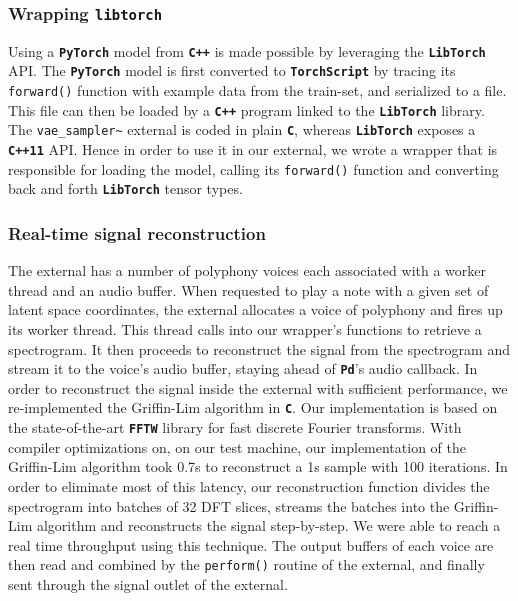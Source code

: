 \documentclass[11pt, english]{article}
\begin{document}
\subsubsection{Wrapping \texttt{libtorch}} 

Using a \textbf{\texttt{PyTorch}} model from \textbf{\texttt{C++}} is made possible by leveraging the \textbf{\texttt{LibTorch}} API. The \textbf{\texttt{PyTorch}} model is first converted to \textbf{\texttt{TorchScript}} by tracing its \texttt{forward()} function with example data from the train-set, and serialized to a file. This file can then be loaded by a \textbf{\texttt{C++}} program linked to the \textbf{\texttt{LibTorch}} library. \newline
The \texttt{vae\_sampler\~} external is coded in plain \textbf{\texttt{C}}, whereas \textbf{\texttt{LibTorch}} exposes a \textbf{\texttt{C++11}} API. Hence in order to use it in our external, we wrote a wrapper that is responsible for loading the model, calling its \texttt{forward()} function and converting back and forth \textbf{\texttt{LibTorch}} tensor types.

\subsubsection{Real-time signal reconstruction}

The external has a number of polyphony voices each associated with a worker thread and an audio buffer. When requested to play a note with a given set of latent space coordinates, the external allocates a voice of polyphony and fires up its worker thread. This thread calls into our wrapper's functions to retrieve a spectrogram. It then proceeds to reconstruct the signal from the spectrogram and stream it to the voice's audio buffer, staying ahead of \textbf{\texttt{Pd}}'s audio callback. \newline
In order to reconstruct the signal inside the external with sufficient performance, we re-implemented the Griffin-Lim algorithm in \textbf{\texttt{C}}. Our implementation is based on the state-of-the-art \textbf{\texttt{FFTW}} library for fast discrete Fourier transforms. With compiler optimizations on, on our test machine, our implementation of the Griffin-Lim algorithm took 0.7s to reconstruct a 1s sample with 100 iterations. In order to eliminate most of this latency, our reconstruction function divides the spectrogram into batches of 32 DFT slices, streams the batches into the Griffin-Lim algorithm and reconstructs the signal step-by-step. We were able to reach a real time throughput using this technique.\newline
The output buffers of each voice are then read and combined by the \texttt{perform()} routine of the external, and finally sent through the signal outlet of the external.
\end{document}
